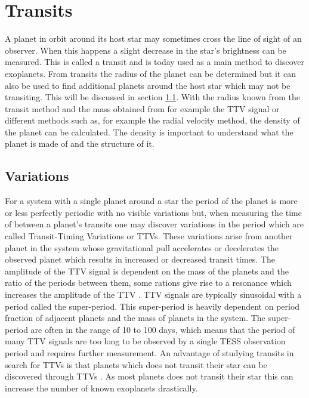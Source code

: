 \documentclass[12pt]{report}
\begin{document}
\section{Transits}
	A planet in orbit around its host star may sometimes cross the line of sight of an observer. When this happens a slight decrease in the star's brightness can be measured. This is called a transit and is today used as a main method to discover exoplanets. From transits the radius of the planet can be determined but it can also be used to find additional planets around the host star which may not be transiting. This will be discussed in section \ref{sec:trans_vari}. With the radius known from the transit method and the mass obtained from for example the TTV signal or different methods such as, for example the radial velocity method, the density of the planet can be calculated. The density is important to understand what the planet is made of and the structure of it.

\subsection{Variations}
\label{sec:trans_vari}

	For a system with a single planet around a star the period of the planet is more or less perfectly periodic with no visible variations but, when measuring the time of between a planet's transits one may discover variations in the period which are called Transit-Timing Variations or TTVs. These variations arise from another planet in the system whose gravitational pull accelerates or decelerates the observed planet which results in increased or decreased transit times. The amplitude of the TTV signal is dependent on the mass of the planets and the ratio of the periods between them, some rations give rise to a resonance which increases the amplitude of the TTV \citep{0004-637X-688-1-636}. TTV signals are typically sinusoidal \citep{2012ApJ...761..122L} with a period called the super-period. This super-period is heavily dependent on period fraction of adjacent planets and the mass of planets in the system. The super-period are often in the range of 10 to 100 days, which means that the period of many TTV signals are too long to be observed by a single TESS observation period and requires further measurement. An advantage of studying transits in search for TTVs is that planets which does not transit their star can be discovered through TTVs \citep{0004-637X-777-1-3}. As most planets does not transit their star this can increase the number of known exoplanets drastically.
\end{document}
